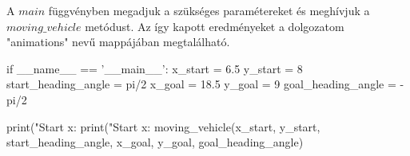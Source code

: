 A $ main $ függvényben megadjuk a szükséges paramétereket és meghívjuk a \\ $ moving\_vehicle $ metódust. Az így kapott eredményeket a dolgozatom "animations" nevű mappájában megtalálható.

\begin{python}
if __name__ == '__main__':
    x_start = 6.5
    y_start = 8
    start_heading_angle = pi/2
    x_goal = 18.5
    y_goal = 9
    goal_heading_angle = -pi/2

    print("Start x: %
    print("Start x: %
    moving_vehicle(x_start, y_start, start_heading_angle, x_goal,
     y_goal, goal_heading_angle)
\end{python}


